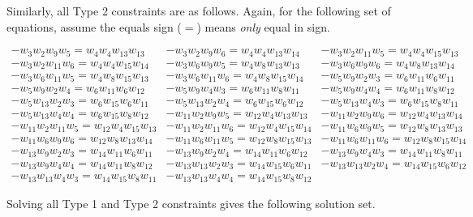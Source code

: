 \documentclass[12pt]{article}
\theoremstyle{plain}
\theoremstyle{definition}
\theoremstyle{remark}
\theoremstyle{definition}
\begin{document}
Similarly, all Type 2 constraints are as follows. Again, for the following set of equations, assume the equals sign ($=$) means \textit{only} equal in sign.

\begin{eqnarray*}
        -w_{3}w_{2}w_{9}w_{5} = w_{4}w_{4}w_{13}w_{13} & -w_{3}w_{2}w_{9}w_{6} = w_{4}w_{4}w_{13}w_{14} & -w_{3}w_{2}w_{11}w_{5} = w_{4}w_{4}w_{15}w_{13} \\
        -w_{3}w_{2}w_{11}w_{6} = w_{4}w_{4}w_{15}w_{14} & -w_{3}w_{6}w_{9}w_{5} = w_{4}w_{8}w_{13}w_{13} & -w_{3}w_{6}w_{9}w_{6} = w_{4}w_{8}w_{13}w_{14} \\
        -w_{3}w_{6}w_{11}w_{5} = w_{4}w_{8}w_{15}w_{13} & -w_{3}w_{6}w_{11}w_{6} = w_{4}w_{8}w_{15}w_{14} & -w_{5}w_{9}w_{2}w_{3} = w_{6}w_{11}w_{6}w_{11} \\
        -w_{5}w_{9}w_{2}w_{4} = w_{6}w_{11}w_{6}w_{12} & -w_{5}w_{9}w_{4}w_{3} = w_{6}w_{11}w_{8}w_{11} & -w_{5}w_{9}w_{4}w_{4} = w_{6}w_{11}w_{8}w_{12} \\
        -w_{5}w_{13}w_{2}w_{3} = w_{6}w_{15}w_{6}w_{11} & -w_{5}w_{13}w_{2}w_{4} = w_{6}w_{15}w_{6}w_{12} & -w_{5}w_{13}w_{4}w_{3} = w_{6}w_{15}w_{8}w_{11} \\
        -w_{5}w_{13}w_{4}w_{4} = w_{6}w_{15}w_{8}w_{12} & -w_{11}w_{2}w_{9}w_{5} = w_{12}w_{4}w_{13}w_{13} & -w_{11}w_{2}w_{9}w_{6} = w_{12}w_{4}w_{13}w_{14} \\
        -w_{11}w_{2}w_{11}w_{5} = w_{12}w_{4}w_{15}w_{13} & -w_{11}w_{2}w_{11}w_{6} = w_{12}w_{4}w_{15}w_{14} & -w_{11}w_{6}w_{9}w_{5} = w_{12}w_{8}w_{13}w_{13} \\
        -w_{11}w_{6}w_{9}w_{6} = w_{12}w_{8}w_{13}w_{14} & -w_{11}w_{6}w_{11}w_{5} = w_{12}w_{8}w_{15}w_{13} & -w_{11}w_{6}w_{11}w_{6} = w_{12}w_{8}w_{15}w_{14} \\
        -w_{13}w_{9}w_{2}w_{3} = w_{14}w_{11}w_{6}w_{11} & -w_{13}w_{9}w_{2}w_{4} = w_{14}w_{11}w_{6}w_{12} & -w_{13}w_{9}w_{4}w_{3} = w_{14}w_{11}w_{8}w_{11} \\
        -w_{13}w_{9}w_{4}w_{4} = w_{14}w_{11}w_{8}w_{12} & -w_{13}w_{13}w_{2}w_{3} = w_{14}w_{15}w_{6}w_{11} & -w_{13}w_{13}w_{2}w_{4} = w_{14}w_{15}w_{6}w_{12} \\
        -w_{13}w_{13}w_{4}w_{3} = w_{14}w_{15}w_{8}w_{11} & -w_{13}w_{13}w_{4}w_{4} = w_{14}w_{15}w_{8}w_{12} & 
\end{eqnarray*}

Solving all Type 1 and Type 2 constraints gives the following solution set.
\end{document}
